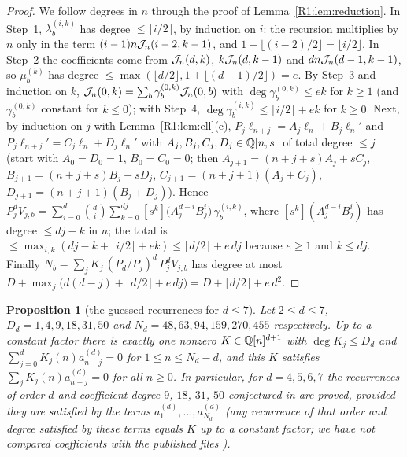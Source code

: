 \documentclass[11pt]{amsart}
\newtheorem{proposition}[theorem]{Proposition}
\theoremstyle{definition}
\theoremstyle{remark}
\begin{document}
\begin{proof}
We follow degrees in $n$ through the proof of Lemma~\ref{R1:lem:reduction}. In Step~1,
$\lambda^{(i,k)}_b$ has degree $\le\lfloor i/2\rfloor$, by induction on $i$: the recursion
multiplies by $n$ only in the term $(i-1)n\mathcal{J}_n(i-2,k-1)$, and
$1+\lfloor(i-2)/2\rfloor=\lfloor i/2\rfloor$. In Step~2 the coefficients come from
$\mathcal{J}_n(d,k)$, $k\mathcal{J}_n(d,k-1)$ and $dn\mathcal{J}_n(d-1,k-1)$, so $\mu^{(k)}_b$ has degree
$\le\max(\lfloor d/2\rfloor,1+\lfloor(d-1)/2\rfloor)=e$. By Step~3 and induction on $k$,
$\mathcal{J}_n(0,k)=\sum_b\gamma^{(0,k)}_b\mathcal{J}_n(0,b)$ with $\deg\gamma^{(0,k)}_b\le ek$ for $k\ge1$
(and $\gamma^{(0,k)}_b$ constant for $k\le0$); with Step~4,
$\deg\gamma^{(i,k)}_b\le\lfloor i/2\rfloor+ek$ for $k\ge0$.
Next, by induction on $j$ with Lemma~\ref{R1:lem:ell}(c),
$P_j\ell_{n+j}=A_j\ell_n+B_j\ell_n'$ and $P_j\ell_{n+j}'=C_j\ell_n+D_j\ell_n'$ with
$A_j,B_j,C_j,D_j\in\mathbb{Q}[n,s]$ of total degree $\le j$ (start with $A_0=D_0=1$,
$B_0=C_0=0$; then $A_{j+1}=(n+j+s)A_j+sC_j$, $B_{j+1}=(n+j+s)B_j+sD_j$,
$C_{j+1}=(n+j+1)(A_j+C_j)$, $D_{j+1}=(n+j+1)(B_j+D_j)$). Hence
$P_j^dV_{j,b}=\sum_{i=0}^{d}\binom di\sum_{k=0}^{dj}[s^k]\bigl(A_j^{d-i}B_j^{i}\bigr)\,
\gamma^{(i,k)}_b$, where $[s^k](A_j^{d-i}B_j^i)$ has degree $\le dj-k$ in $n$; the total is
$\le\max_{i,k}(dj-k+\lfloor i/2\rfloor+ek)\le\lfloor d/2\rfloor+e\,dj$ because $e\ge1$ and
$k\le dj$. Finally $N_b=\sum_jK_j\,(P_d/P_j)^d\,P_j^dV_{j,b}$ has degree at most
$D+\max_j\bigl(d(d-j)+\lfloor d/2\rfloor+e\,dj\bigr)=D+\lfloor d/2\rfloor+e\,d^2$.
\end{proof}

\begin{proposition}[the guessed recurrences for $d\le7$]\label{R1:prop:soft}
Let $2\le d\le7$, $D_d=1,4,9,18,31,50$ and $N_d=48,63,94,159,270,455$ respectively. Up to a
constant factor
there is exactly one nonzero $K\in\mathbb{Q}[n]^{d+1}$ with $\deg K_j\le D_d$ and
$\sum_{j=0}^dK_j(n)a^{(d)}_{n+j}=0$ for $1\le n\le N_d-d$, and this $K$ satisfies
$\sum_jK_j(n)a^{(d)}_{n+j}=0$ for \emph{all} $n\ge0$. In particular, for $d=4,5,6,7$ the
recurrences of order $d$ and coefficient degree $9$, $18$, $31$, $50$ conjectured in
\cite{R1-KZ} are proved, provided they are satisfied by the terms
$a^{(d)}_1,\dots,a^{(d)}_{N_d}$ (any recurrence of that order and degree satisfied by these
terms equals $K$ up to a constant factor; we have not compared coefficients with the published
files \cite{R1-KZfiles}).
\end{proposition}
\end{document}
